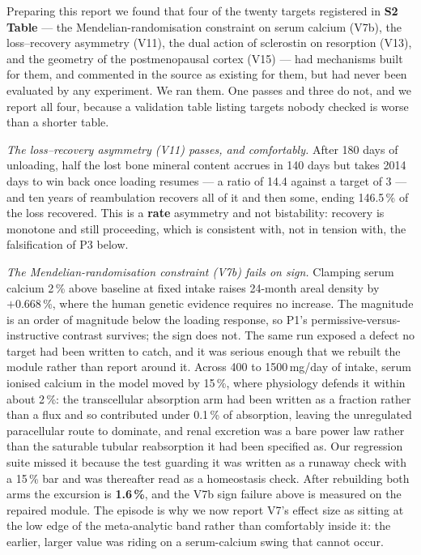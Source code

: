 \documentclass[10pt,letterpaper]{article}
\begin{document}
Preparing this report we found that four of the twenty targets registered in
\textbf{S2 Table} --- the Mendelian-randomisation constraint on serum calcium
(V7b), the loss--recovery asymmetry (V11), the dual action of sclerostin on
resorption (V13), and the geometry of the postmenopausal cortex (V15) --- had
mechanisms built for them, and commented in the source as existing for them, but
had never been evaluated by any experiment. We ran them. One passes and three do
not, and we report all four, because a validation table listing targets nobody
checked is worse than a shorter table.

\emph{The loss--recovery asymmetry (V11) passes, and comfortably.} After 180
days of unloading, half the lost bone mineral content accrues in 140 days but
takes 2014 days to win back once loading resumes --- a ratio of 14.4 against a
target of 3 --- and ten years of reambulation recovers all of it and then some, ending 146.5\,\% of the loss recovered. This
is a \textbf{rate} asymmetry and not bistability: recovery is monotone and still
proceeding, which is consistent with, not in tension with, the falsification of
P3 below.

\emph{The Mendelian-randomisation constraint (V7b) fails on sign.} Clamping
serum calcium 2\,\% above baseline at fixed intake raises 24-month areal density
by $+0.668$\,\%, where the human genetic evidence requires no increase. The
magnitude is an order of magnitude below the loading response, so P1's
permissive-versus-instructive contrast survives; the sign does not. The same run
exposed a defect no target had been written to catch, and it was serious enough
that we rebuilt the module rather than report around it. Across 400 to
1500\,mg/day of intake, serum ionised calcium in the model moved by 15\,\%,
where physiology defends it within about 2\,\%: the transcellular absorption arm
had been written as a fraction rather than a flux and so contributed under
0.1\,\% of absorption, leaving the unregulated paracellular route to dominate,
and renal excretion was a bare power law rather than the saturable tubular
reabsorption it had been specified as. Our regression suite missed it because the
test guarding it was written as a runaway check with a 15\,\% bar and was
thereafter read as a homeostasis check. After rebuilding both arms the excursion
is \textbf{1.6\,\%}, and the V7b sign failure above is measured on the repaired
module. The episode is why we now report V7's effect size as sitting at the low
edge of the meta-analytic band \cite{tai2015} rather than comfortably inside it:
the earlier, larger value was riding on a serum-calcium swing that cannot occur.
\end{document}

